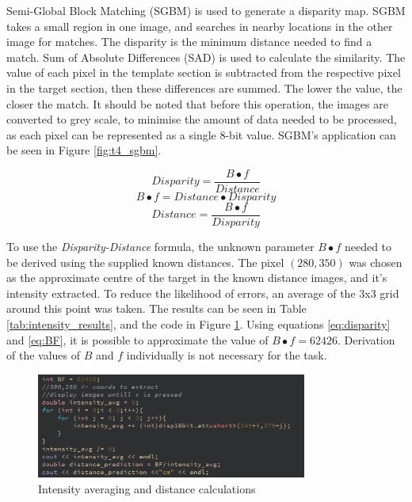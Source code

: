 \documentclass[conference]{IEEEtran}
\begin{document}
Semi-Global Block Matching (SGBM) is used to generate a disparity map. SGBM takes a small region in one image, and searches in nearby locations in the other image for matches. The disparity is the minimum distance needed to find a match. Sum of Absolute Differences (SAD) is used to calculate the similarity\cite{StereoBlockMatching}. The value of each pixel in the template section is subtracted from the respective pixel in the target section, then these differences are summed. The lower the value, the closer the match. It should be noted that before this operation, the images are converted to grey scale, to minimise the amount of data needed to be processed, as each pixel can be represented as a single 8-bit value. SGBM's application can be seen in Figure \ref{fig:t4_sgbm}.

\begin{equation} \label{eq:disparity}
Disparity = \frac{B \bullet f}{Distance}
\end{equation}
\begin{equation} \label{eq:BF}
B \bullet f = Distance \bullet Disparity
\end{equation}
\begin{equation}	\label{eq:Distance}
Distance = \frac{B\bullet f}{Disparity}
\end{equation}

To use the \textit{Disparity-Distance} formula, the unknown parameter $B \bullet f$ needed to be derived using the supplied known distances. The pixel $(280,350)$ was chosen as the approximate centre of the target in the known distance images, and it's intensity extracted. To reduce the likelihood of errors, an average of the 3x3 grid around this point was taken. The results can be seen in Table \ref{tab:intensity_results}, and the code in Figure \ref{fig:t4_intensity}. Using equations \ref{eq:disparity} and \ref{eq:BF}, it is possible to approximate the value of $B \bullet f = 62426$. Derivation of the values of $B$ and $f$ individually is not necessary for the task. 

\begin{figure}[H]
\centering
\includegraphics[width=3.5in]{t4_intensity}
\caption{Intensity averaging and distance calculations}
\label{fig:t4_intensity}
\end{figure}
\end{document}
